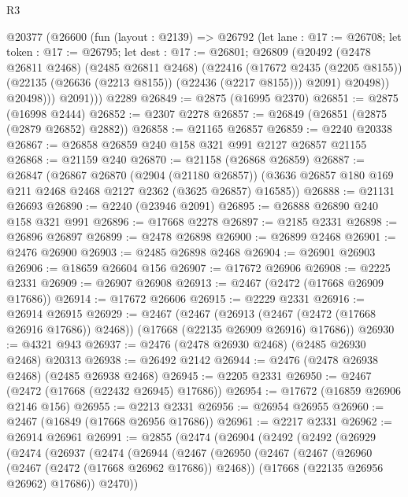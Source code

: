 \begin{lexlean}{R3}
\begin{coremodule}
        @20377
          (@26600
            (fun (layout : @2139) =>
            @26792
              (let lane : @17 := @26708;
              let token : @17 := @26795;
              let dest : @17 := @26801;
              @26809
                (@20492
                  (@2478 @26811 @2468)
                  (@2485 @26811 @2468)
                  (@22416
                    (@17672 @2435 (@2205 @8155))
                    (@22135 (@26636 (@2213 @8155)) (@22436 (@2217 @8155)))
                    @2091)
                  @20498))
              @20498)))
          @2091)))
    @2289
@26849 := @2875 (@16995 @2370)
@26851 := @2875 (@16998 @2444)
@26852 := @2307 @2278
@26857 := @26849 (@26851 (@2875 (@2879 @26852) @2882))
@26858 := @21165 @26857
@26859 := @2240 @20338
@26867 := @26858 @26859 @240 @158 @321 @991 @2127 @26857 @21155
@26868 := @21159 @240
@26870 := @21158 (@26868 @26859)
@26887 := @26847
    (@26867
      @26870
      (@2904 (@21180 @26857))
      (@3636 @26857 @180 @169 @211 @2468 @2468 @2127 @2362 (@3625 @26857) @16585))
@26888 := @21131 @26693
@26890 := @2240 (@23946 @2091)
@26895 := @26888 @26890 @240 @158 @321 @991
@26896 := @17668 @2278
@26897 := @2185 @2331
@26898 := @26896 @26897
@26899 := @2478 @26898
@26900 := @26899 @2468
@26901 := @2476 @26900
@26903 := @2485 @26898 @2468
@26904 := @26901 @26903
@26906 := @18659 @26604 @156
@26907 := @17672 @26906
@26908 := @2225 @2331
@26909 := @26907 @26908
@26913 := @2467 (@2472 (@17668 @26909 @17686))
@26914 := @17672 @26606
@26915 := @2229 @2331
@26916 := @26914 @26915
@26929 := @2467
    (@2467
      (@26913 (@2467 (@2472 (@17668 @26916 @17686)) @2468))
      (@17668 (@22135 @26909 @26916) @17686))
@26930 := @4321 @943
@26937 := @2476 (@2478 @26930 @2468) (@2485 @26930 @2468) @20313
@26938 := @26492 @2142
@26944 := @2476 (@2478 @26938 @2468) (@2485 @26938 @2468)
@26945 := @2205 @2331
@26950 := @2467 (@2472 (@17668 (@22432 @26945) @17686))
@26954 := @17672 (@16859 @26906 @2146 @156)
@26955 := @2213 @2331
@26956 := @26954 @26955
@26960 := @2467 (@16849 (@17668 @26956 @17686))
@26961 := @2217 @2331
@26962 := @26914 @26961
@26991 := @2855
    (@2474
      (@26904
        (@2492
          (@2492
            (@26929
              (@2474
                (@26937
                  (@2474
                    (@26944
                      (@2467
                        (@26950
                          (@2467
                            (@2467
                              (@26960 (@2467 (@2472 (@17668 @26962 @17686)) @2468))
                              (@17668 (@22135 @26956 @26962) @17686))
                            @2470))

\end{coremodule}
\end{lexlean}
